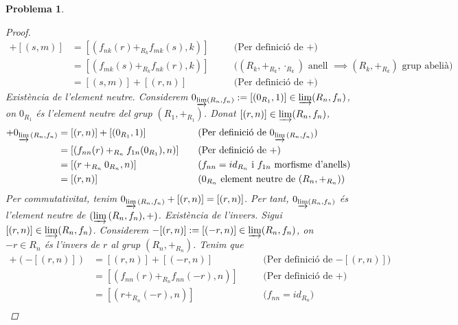 \documentclass[compress]{article}
\newtheorem{problema}{Problema}
\theoremstyle{definition}
\begin{document}
\begin{problema}
\begin{enumerate}
\begin{proof}
            \begin{align*}
                [(r,n)]+[(s,m)]
                &=[(f_{nk}(r)+_{R_{k}}f_{mk}(s),k)]
                &\quad&\textrm{(Per definició de $+$)}\\
                &=[(f_{mk}(s)+_{R_{k}}f_{nk}(r),k)]
                &\quad&\textrm{($(R_{k},+_{R_{k}},\cdot_{R_{k}})$ anell $\implies(R_{k},+_{R_{k}})$ grup abelià)}\\
                &=[(s,m)]+[(r,n)]
                &\quad&\textrm{(Per definició de $+$)}
            \end{align*}
            Existència de l'element neutre. Considerem $0_{\varinjlim(R_{n},f_{n})}:=[(0_{R_{1}},1)]\in\varinjlim(R_{n},f_{n})$, on $0_{R_{1}}$ és l'element neutre del grup $(R_{1},+_{R_{1}})$. Donat $[(r,n)]\in\varinjlim(R_{n},f_{n})$,
            \begin{align*}
                [(r,n)]+0_{\varinjlim{(R_{n},f_{n})}}
                &=[(r,n)]+[(0_{R_{1}},1)]
                &\quad&\textrm{(Per definició de $0_{\varinjlim{(R_{n},f_{n})}}$)}\\
                &=[(f_{nn}(r)+_{R_{n}}f_{1n}(0_{R_{1}}),n)]
                &\quad&\textrm{(Per definició de $+$)}\\
                &=[(r+_{R_{n}}0_{R_{n}},n)]
                &\quad&\textrm{($f_{nn}=id_{R_{n}}$ i $f_{1n}$ morfisme d'anells)}\\
                &=[(r,n)]
                &\quad&\textrm{($0_{R_{n}}$ element neutre de $(R_{n},+_{R_{n}})$)}
            \end{align*}
            Per commutativitat, tenim $0_{\varinjlim{(R_{n},f_{n})}}+[(r,n)]=[(r,n)]$. Per tant, $0_{\varinjlim(R_{n},f_{n})}$ és l'element neutre de $(\varinjlim{(R_{n},f_{n})},+)$.\newline
            Existència de l'invers. Sigui $[(r,n)]\in\varinjlim(R_{n},f_{n})$. Considerem $-[(r,n)]:=[(-r,n)]\in\varinjlim(R_{n},f_{n})$, on $-r\in R_{n}$ és l'invers de $r$ al grup $(R_{n},+_{R_{n}})$. Tenim que
            \begin{align*}
                [(r,n)]+(-[(r,n)])
                &=[(r,n)]+[(-r,n)]
                &\quad&\textrm{(Per definició de $-[(r,n)]$)}\\
                &=[(f_{nn}(r)+_{R_{n}}f_{nn}(-r),n)]
                &\quad&\textrm{(Per definició de $+$)}\\
                &=[(r+_{R_{n}}(-r),n)]
                &\quad&\textrm{($f_{nn}=id_{R_{n}}$)}\\

\end{align*}
\end{proof}
\end{enumerate}
\end{problema}
\end{document}
